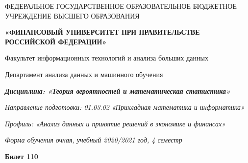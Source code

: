 \documentclass[a4paper,11pt]{article}
\begin{document}
\begin{center}
ФЕДЕРАЛЬНОЕ ГОСУДАРСТВЕННОЕ ОБРАЗОВАТЕЛЬНОЕ БЮДЖЕТНОЕ УЧРЕЖДЕНИЕ ВЫСШЕГО ОБРАЗОВАНИЯ

    \textbf{«ФИНАНСОВЫЙ УНИВЕРСИТЕТ ПРИ ПРАВИТЕЛЬСТВЕ РОССИЙСКОЙ ФЕДЕРАЦИИ»}

Факультет информационных технологий и анализа больших данных

Департамент анализа данных и машинного обучения

\textit{
	\textbf{Дисциплина: «Теория вероятностей и математическая статистика»}}

\textit{Направление подготовки: 01.03.02 «Прикладная математика и информатика»}

\textit{Профиль: «Анализ данных и принятие решений в экономике и финансах»}

\textit{Форма обучения очная, учебный 2020/2021 год, 4 семестр}

\textbf{Билет 110}

\end{center}
\end{document}
